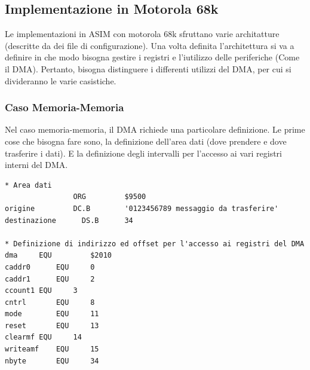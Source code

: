 \subsection{Implementazione in Motorola 68k}
Le implementazioni in ASIM con motorola 68k sfruttano varie architatture (descritte da dei file di configurazione). Una volta definita l'architettura si va a definire in che modo bisogna gestire i registri e l'iutilizzo delle periferiche (Come il DMA). Pertanto, bisogna distinguere i differenti utilizzi del DMA, per cui si divideranno le varie casistiche.

\subsubsection{Caso Memoria-Memoria}
Nel caso memoria-memoria, il DMA richiede una particolare definizione. Le prime cose che bisogna fare sono, la definizione dell'area dati (dove prendere e dove trasferire i dati). E la definizione degli intervalli per l'accesso ai vari registri interni del DMA.
\begin{lstlisting}
* Area dati
                ORG 		$9500
origine	        DC.B		'0123456789 messaggio da trasferire'
destinazione	  DS.B	    34

* Definizione di indirizzo ed offset per l'accesso ai registri del DMA
dma		EQU 		$2010
caddr0		EQU		0
caddr1		EQU		2
ccount1	EQU		3
cntrl		EQU		8
mode		EQU		11
reset		EQU		13
clearmf	EQU		14
writeamf	EQU		15
nbyte		EQU		34
\end{lstlisting}

